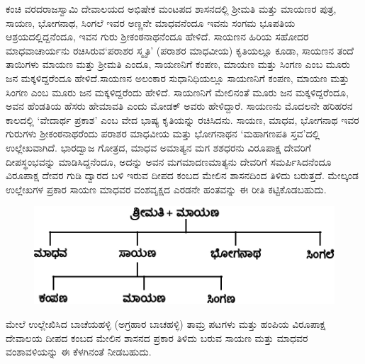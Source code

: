 ಕಂಚಿ ವರದರಾಜಸ್ವಾಮಿ ದೇವಾಲಯದ ಅಭಿಷೇಕ ಮಂಟಪದ ಶಾಸನದಲ್ಲಿ ಶ‍್ರೀಮತಿ ಮತ್ತು ಮಾಯಣರ ಪುತ್ರ, ಸಾಯಣ, ಭೋಗನಾಥ, ಸಿಂಗಲೆ ಇವರ ಅಣ್ಣನೇ ಮಾಧವನೆಂದೂ ಇವನು ಸಂಗಮ ಭೂಪತಿಯ ಆಶ್ರಯದಲ್ಲಿದ್ದನೆಂದೂ, ಇವನ ಗುರು ಶ‍್ರೀಕಂಠನಾಥನೆಂದೂ ಹೇಳಿದೆ. ಸಾಯಣನ ಹಿರಿಯ ಸಹೋದರ ಮಾಧವಾಚಾರ್ಯನು ರಚಿಸಿರುವ\break ‘ಪರಾಶರ ಸ್ಮೃತಿ’ (ಪರಾಶರ ಮಾಧವೀಯ) ಕೃತಿಯಲ್ಲೂ ಕೂಡಾ, ಸಾಯಣನ ತಂದೆ ತಾಯಿಗಳು ಮಾಯಣ ಮತ್ತು ಶ‍್ರೀಮತಿ ಎಂದೂ, ಸಾಯಣನಿಗೆ ಕಂಪಣ, ಮಾಯಣ ಮತ್ತು ಸಿಂಗಣ ಎಂಬ ಮೂರು ಜನ ಮಕ್ಕಳಿದ್ದರೆಂದೂ ಹೇಳಿದೆ.\break ಸಾಯಣನ ಅಲಂಕಾರ ಸುಧಾನಿಧಿಯಲ್ಲೂ ಸಾಯಣನಿಗೆ ಕಂಪಣ, ಮಾಯಣ ಮತ್ತು ಸಿಂಗಣ ಎಂಬ ಮೂರು ಜನ ಮಕ್ಕಳಿದ್ದರೆಂದು ಹೇಳಿದೆ. ಸಾಯಣನಿಗೆ ಮೇಲಿನಂತೆ ಮೂರು ಜನ ಮಕ್ಕಳಿದ್ದರೆಂದೂ, ಅವನ ಹೆಂಡತಿಯ ಹೆಸರು ಹೇಮಾವತಿ ಎಂದು ಮೋಡಕ್​ ಅವರು ಹೇಳಿದ್ದಾರೆ. ಸಾಯಣನು ಮೊದಲನೇ ಹರಿಹರನ ಕಾಲದಲ್ಲಿ ‘ವೇದಾರ್ಥ ಪ್ರಕಾಶ’ ಎಂಬ ವೇದ ಭಾಷ್ಯ ಕೃತಿಯನ್ನು ರಚಿಸಿದನು. ಸಾಯಣ, ಮಾಧವ, ಭೋಗನಾಥ ಇವರ ಗುರುಗಳು ಶ‍್ರೀಕಂಠನಾಥರೆಂದು ಪರಾಶರ ಮಾಧವೀಯ ಮತ್ತು ಭೋಗನಾಥನ ‘ಮಹಾಗಣಪತಿ ಸ್ತವ’ದಲ್ಲಿ ಉಲ್ಲೇಖವಾಗಿದೆ. ಭಾರದ್ವಾಜ ಗೋತ್ರದ, ಮಾಧವ ಅಮಾತ್ಯನ ಮಗ ಶಶಧರನು ವಿರೂಪಾಕ್ಷ ದೇವರಿಗೆ ದೀಪಸ್ಥಂಭವನ್ನು ಮಾಡಿಸಿದ್ದನೆಂದೂ, ಅದನ್ನು ಅವನ ಮಗ\break ಮಾದಣಮಾತ್ಯನು ದೇವರಿಗೆ ಸಮರ್ಪಿಸಿದನೆಂದೂ ವಿರೂಪಾಕ್ಷ ದೇವರ ಗುಡಿ ದ್ವಾರದ ಬಳಿ ಇರುವ ದೀಪದ ಕಂಬದ ಮೇಲಿನ ಶಾಸನದಿಂದ ತಿಳಿದು ಬರುತ್ತದೆ. ಮೇಲ್ಕಂಡ ಉಲ್ಲೇಖಗಳ ಪ್ರಕಾರ ಸಾಯಣ ಮಾಧವರ ವಂಶವೃಕ್ಷದ ಎರಡನೇ ಹಂತವನ್ನು ಈ ರೀತಿ ಕಟ್ಟಿಕೊಡಬಹುದು.

\begin{figure}[H]
\includegraphics[scale=1.05]{images/chap4/add-chap4fig4.jpeg}
\end{figure}

ಮೇಲೆ ಉಲ್ಲೇಖಿಸಿದ ಬಾಚೆಯಹಳ್ಳಿ (ಅಗ್ರಹಾರ ಬಾಚಹಳ್ಳಿ) ತಾಮ್ರ ಪಟಗಳು ಮತ್ತು ಹಂಪಿಯ ವಿರೂಪಾಕ್ಷ ದೇವಾಲಯ ದೀಪದ ಕಂಬದ ಮೇಲಿನ ಶಾಸನದ ಪ್ರಕಾರ ತಿಳಿದು ಬರುವ ಸಾಯಣ ಮತ್ತು ಮಾಧವರ ವಂಶಾವಳಿಯನ್ನು ಈ ಕೆಳಗಿನಂತೆ ನೀಡಬಹುದು.


